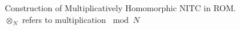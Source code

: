 \begin{figure}[h!]
\begin{center}
\begin{tabular}{|ll|}

\hline          
\end{tabular}
\caption{Construction of Multiplicatively Homomorphic NITC in ROM. \\ $\otimes_N$ refers to multiplication $\bmod N$}
\label{table:nitc-mh-rom}
\end{center}
\end{figure}


